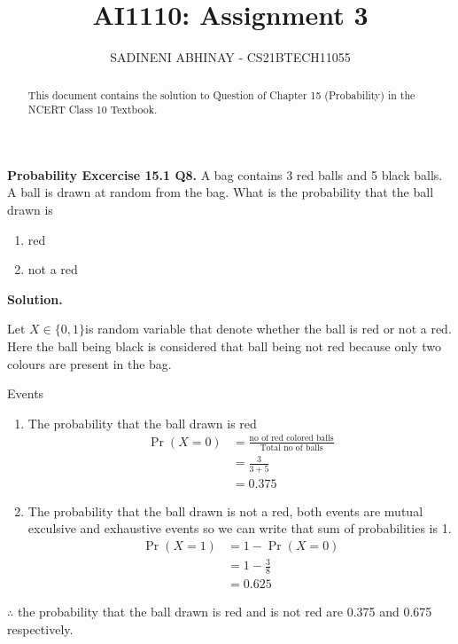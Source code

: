 \documentclass[journal,12pt,twocolumn]{IEEEtran}
\title{
	AI1110: Assignment 3
}
\author{ 
	SADINENI ABHINAY - CS21BTECH11055
}
\providecommand{\pr}[1]{\ensuremath{\Pr\left(#1\right)}}
\begin{document}
	\maketitle
	\begin{abstract}
		This document contains the solution to Question of Chapter 15 (Probability) in the NCERT Class 10 Textbook.
	\end{abstract}
	
	\textbf{Probability Excercise 15.1 Q8.}
	A bag contains 3 red balls and 5 black balls. A ball is drawn at random from the bag. What is the probability that the ball drawn is 
	\begin{enumerate}
		\item red
		\item not a red
	\end{enumerate}
	
	\textbf{Solution.}
	
	Let $X \in \{0,1\} $is random variable that denote whether the ball is red or not a red.
	Here the ball being black is considered that ball being not red because only two colours are present in the bag.
	
	\begin{table}[ht!]
	\centering
	
	\caption{Events}
	\label{table:1}
	\end{table}
	\begin{enumerate}
	\item The probability that the ball drawn is red 
	   \begin{align}
	   	\pr{X=0}&=\frac{\text{no of red colored balls}}{\text{Total no of balls}}\\
	   	        &=\frac{3}{3+5}\\
	   	        &=0.375
	   \end{align}
	\item The probability that the ball drawn is not a red, both events are mutual exculsive and exhaustive events so we can write that sum of probabilities is 1.
	\begin{align}
		\pr{X=1}&=1-\pr{X=0}\\
		&=1-\frac{3}{8}\\
		&=0.625
	\end{align}
\end{enumerate}
$\therefore$ the probability that the ball drawn is red and is not red are 0.375 and 0.675 respectively.
\end{document}
